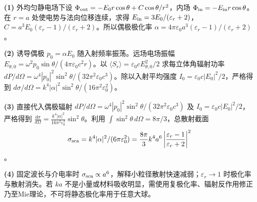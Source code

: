 \par\noindent\textbf{(1)} 外均匀静电场下设 \(\Phi_{\rm out}=-E_0r\cos\theta+C\cos\theta/r^2\)，内场 \(\Phi_{\rm in}=-E_{\rm in}r\cos\theta\)。在 \(r=a\) 处使电势与法向位移连续，求得 \(E_{\rm in}=3E_0/(\varepsilon_r+2)\)，\(C=a^3E_0(\varepsilon_r-1)/(\varepsilon_r+2)\)。所以偶极极化率 \(\alpha=4\pi\varepsilon_0a^3(\varepsilon_r-1)/(\varepsilon_r+2)\)。
\par\noindent\textbf{(2)} 诱导偶极 \(p_0=\alpha E_0\) 随入射频率振荡。远场电场振幅 \(E_{\theta,0}=\omega^2p_0\sin\theta/(4\pi\varepsilon_0c^2r)\)。以 \(\langle S_r\rangle=\varepsilon_0cE_{\theta,0}^2/2\) 求每立体角辐射功率 \(dP/d\Omega=\omega^4|p_0|^2\sin^2\theta/(32\pi^2\varepsilon_0c^3)\)。除以入射平均强度 \(I_0=\varepsilon_0c|E_0|^2/2\)，严格得到 \(d\sigma/d\Omega=k^4|\alpha|^2\sin^2\theta/(16\pi^2\varepsilon_0^2)\)。
\par\noindent\textbf{(3)} 直接代入偶极辐射 \(dP/d\Omega=\omega^4|p_0|^2\sin^2\theta/(32\pi^2\varepsilon_0c^3)\) 及 \(I_0=\varepsilon_0c|E_0|^2/2\)，严格得到 \(\frac{d\sigma}{d\Omega}=\frac{k^4|\alpha|^2}{16\pi^2\varepsilon_0^2}\sin^2\theta\)。利用 \(\int\sin^2\theta\,d\Omega=8\pi/3\)，总散射截面 \[\sigma_{\rm sca}=k^4|\alpha|^2/(6\pi\varepsilon_0^2)=\frac{8\pi}{3}k^4a^6\left|\frac{\varepsilon_r-1}{\varepsilon_r+2}\right|^2\]。
\par\noindent\textbf{(4)} 固定波长与介电率时 \(\sigma_{\rm sca}\propto a^6\)，解释小粒径散射快速减弱；\(\varepsilon_r\to1\) 时极化率与散射消失。若 \(ka\) 不是小量或材料吸收明显，需使用复极化率、辐射反作用修正乃至Mie理论，不可将静态极化率用于任意大球。
